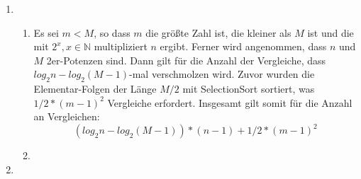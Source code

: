 \documentclass[a4paper,10pt]{scrartcl}
\begin{document}
\begin{enumerate}
\begin{description}
      \end{description}
\item \begin{enumerate}
       \item Es sei $m < M$, so dass $m$ die größte Zahl ist, die kleiner als $M$ ist und die mit $2^x, x \in \mathbb{N}$ multipliziert $n$ ergibt.
	     Ferner wird angenommen, dass $n$ und $M$ 2er-Potenzen sind.
	     Dann gilt für die Anzahl der Vergleiche, dass $log_2 n - log_2 (M - 1)$-mal verschmolzen wird. Zuvor wurden die Elementar-Folgen der Länge $M/2$ mit SelectionSort sortiert, was $1/2 * (m - 1)^2$ Vergleiche erfordert.
	     Insgesamt gilt somit für die Anzahl an Vergleichen:
	     \[
	      (log_2 n - log_2 (M-1)) * (n - 1) + 1/2 * (m - 1)^2
	     \]

       \item 
      \end{enumerate}
\item 
\end{enumerate}
\end{document}

